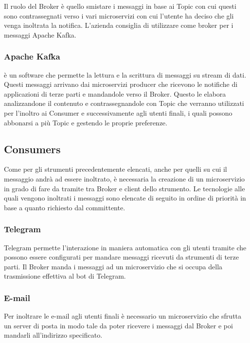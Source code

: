 		Il ruolo del Broker è quello smistare i messaggi in base ai Topic con cui questi sono contrassegnati verso i vari microservizi con cui l'utente ha deciso che gli venga inoltrata la notifica.
		L'azienda consiglia di utilizzare come broker per i messaggi Apache Kafka.
	
		\subsubsection{Apache Kafka}
		 è un software  che permette la lettura e la scrittura di messaggi su stream di dati.
		Questi messaggi arrivano dai microservizi producer che ricevono le notifiche di applicazioni di terze parti e mandandole verso il Broker. Questo le elabora analizzandone il contenuto e contrassegnandole con Topic che verranno utilizzati per l'inoltro ai Consumer e successivamente agli utenti finali, i quali possono abbonarsi a più Topic e gestendo le proprie preferenze.
		
	
	\subsection{Consumers}
		Come per gli strumenti precedentemente elencati, anche per quelli su cui il messaggio andrà ad essere inoltrato, è necessaria la creazione di un microservizio in grado di fare da tramite tra Broker e client dello strumento.
		Le tecnologie alle quali vengono inoltrati i messaggi sono elencate di seguito in ordine di priorità in base a quanto richiesto dal committente.
			
		\subsubsection{Telegram}
		Telegram permette l'interazione in maniera automatica con gli utenti tramite  che possono essere configurati per mandare messaggi ricevuti da strumenti di terze parti.
		Il Broker manda i messaggi ad un microservizio che si occupa della trasmissione effettiva al bot di Telegram.
		
		\subsubsection{E-mail}
		Per inoltrare le e-mail agli utenti finali è necessario un microservizio che sfrutta un server di posta in modo tale da poter ricevere i messaggi dal Broker e poi mandarli all'indirizzo specificato.
		
